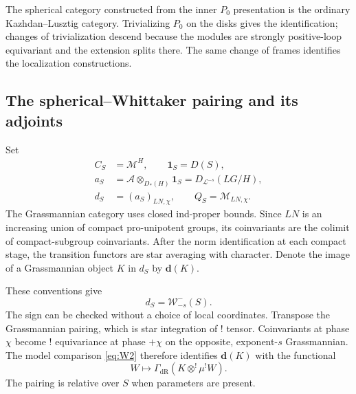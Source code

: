 \documentclass[11pt]{article}
\numberwithin{equation}{section}
\theoremstyle{definition}
\theoremstyle{remark}
\begin{document}
The spherical category constructed from the inner $P_0$ presentation
is the ordinary Kazhdan--Lusztig category.  Trivializing $P_0$ on the
disks gives the identification; changes of trivialization descend
because the modules are strongly positive-loop equivariant and the
extension splits there.  The same change of frames identifies the
localization constructions.

\subsection{The spherical--Whittaker pairing and its adjoints}

Set
\[
 \begin{split}
 C_S&=\mathcal M^H,\qquad \mathbf1_S=D(S),\\
 a_S&=\mathcal A\otimes_{D_*(H)}\mathbf1_S
           =D_{\mathcal L^{-s}}(LG/H),\\
 d_S&=(a_S)_{LN,\chi},\qquad
 Q_S=\mathcal M_{LN,\chi}.
 \end{split}
\]
The Grassmannian category uses closed ind-proper bounds.  Since $LN$
is an increasing union of compact pro-unipotent groups, its
coinvariants are the colimit of compact-subgroup coinvariants.
After the norm identification at each compact stage, the transition
functors are star averaging with character.  Denote the image of a
Grassmannian object $K$ in $d_S$ by $\mathbf d(K)$.

These conventions give
\begin{equation}\label{loop:whittaker-coinvariants}
                     d_S=\mathcal W_{-s}^-(S).
\end{equation}
The sign can be
checked without a choice of local coordinates.  Transpose the
Grassmannian pairing, which is star integration of ! tensor.
Coinvariants at phase $\chi$ become ! equivariance at phase $+\chi$
on the opposite, exponent-$s$ Grassmannian.  The model comparison
\eqref{eq:W2} therefore identifies $\mathbf d(K)$ with the functional
\begin{equation}\label{eq:loop-whittaker-functional}
                 W\longmapsto
                  \Gamma_{\mathrm{dR}}(K\otimes^!\mu^!W).
\end{equation}
The pairing is relative over $S$ when parameters are present.
\end{document}
